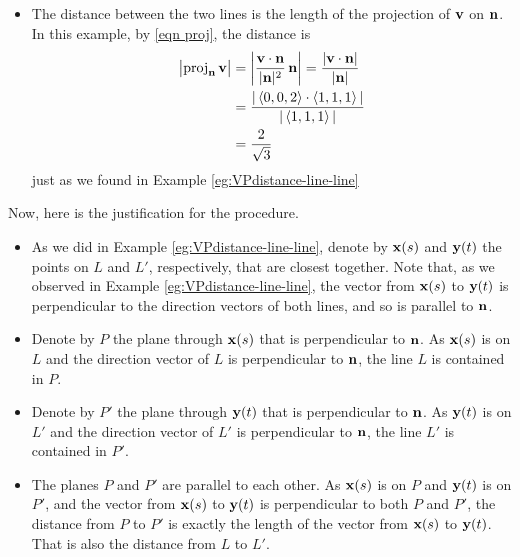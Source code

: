 \begin{eg}
\begin{itemize}
\item
The distance between the two lines is the length of the projection of $\mathbf{v}$
on $\mathbf{n}$. In this example, by \eqref{eqn proj}, the distance is
\begin{align*}
\big|{\rm proj}_{\mathbf{n}}\,\mathbf{v}\big|
&=\left|\frac{\mathbf{v}\cdot\mathbf{n}}{|\mathbf{n}|^2}\,\mathbf{n}\right|
 =\frac{|\mathbf{v}\cdot\mathbf{n}|}{|\mathbf{n}|} \\
&= \frac{|\left< 0,0,2\right>\cdot\left< 1,1,1\right>|}{|\left< 1,1,1\right>|} \\
    &= \frac{2}{\sqrt{3}}
\end{align*} 
just as we found in Example \ref{eg:VPdistance-line-line}
\end{itemize}
Now, here is the justification for the procedure. 
\begin{itemize}
\item
As we did in Example \ref{eg:VPdistance-line-line}, denote by
$\mathbf{x}(s)$ and $\mathbf{y}(t)$ the points on $L$ and $L'$, respectively, 
that are closest together. Note that, as we observed in 
Example \ref{eg:VPdistance-line-line}, the vector from $\mathbf{x}(s)$ to $\mathbf{y}(t)$
is perpendicular to the direction vectors of both lines, and so is parallel 
to $\mathbf{n}$.

\item
Denote by $P$ the plane through $\mathbf{x}(s)$ that is perpendicular to $\mathbf{n}$.
As $\mathbf{x}(s)$ is on $L$ and the direction vector of $L$ is perpendicular to
$\mathbf{n}$, the line $L$ is contained in $P$. 

\item
Denote by $P'$ the plane through $\mathbf{y}(t)$ that is perpendicular to $\mathbf{n}$.
As $\mathbf{y}(t)$ is on $L'$ and the direction vector of $L'$ is perpendicular to
$\mathbf{n}$, the line $L'$ is contained in $P'$.

\item
The planes $P$ and $P'$ are parallel to each other. As $\mathbf{x}(s)$ is on $P$
and $\mathbf{y}(t)$ is on $P'$, and the vector from $\mathbf{x}(s)$ to $\mathbf{y}(t)$ 
is perpendicular to both $P$ and $P'$, the distance from $P$ to $P'$  
is exactly the length of the vector from $\mathbf{x}(s)$ to $\mathbf{y}(t)$.
That is also the distance from $L$ to $L'$.


\end{itemize}
\end{eg}
